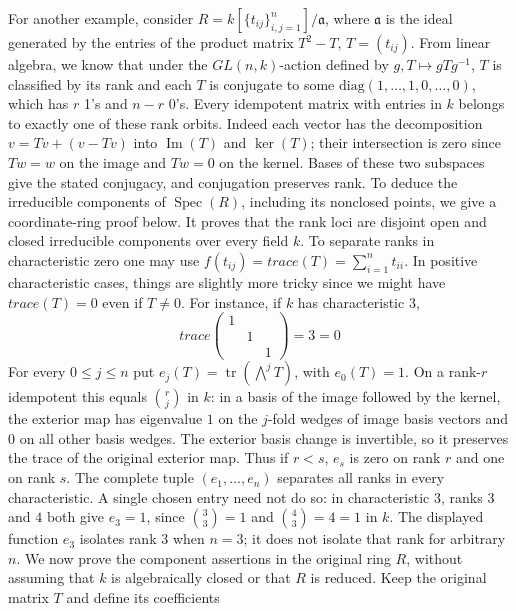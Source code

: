 \begin{example}
\label{editorial-source-example-idempotent-matrices}
For another example, consider
$R = k[\{t_{ij}\}_{i, j = 1}^{n}]/\mathfrak a$, where $\mathfrak a$ is
the ideal generated by the entries of the product matrix $T^2-T$,
$T = (t_{ij})$. From linear algebra, we know that under the
$GL(n, k)$-action defined by $g, T \mapsto gTg^{-1}$, $T$ is
classified by its rank and each $T$ is conjugate to some
$\text{diag}(1, \ldots, 1, 0, \ldots, 0)$, which has $r$ 1's and $n-r$ 0's.
Every idempotent matrix with entries in $k$ belongs to exactly one
of these rank orbits. Indeed each vector has the decomposition
$v=Tv+(v-Tv)$ into $\operatorname{Im}(T)$ and $\ker(T)$;
their intersection is zero since $Tw=w$ on the image and $Tw=0$
on the kernel. Bases of these two subspaces give the stated
conjugacy, and conjugation preserves rank. To deduce the irreducible
components of $\operatorname{Spec}(R)$, including its nonclosed
points, we give a coordinate-ring proof below. It proves that the
rank loci are disjoint open and closed irreducible components over
every field $k$. To separate ranks in characteristic zero one may use
$f(t_{ij}) = trace(T) = \sum_{i = 1}^nt_{ii}$. In positive
characteristic cases, things are slightly more tricky since we
might have $trace(T) = 0$ even if $T \neq 0$. For instance, if $k$ has characteristic $3$,
$$
trace\left(
\begin{matrix}
1 & & \\
& 1 & \\
& & 1
\end{matrix}
\right) = 3 = 0
$$
For every $0\leq j\leq n$ put
$e_j(T)=\operatorname{tr}(\bigwedge^jT)$, with $e_0(T)=1$.
On a rank-$r$ idempotent this equals $\binom rj$ in $k$:
in a basis of the image followed by the kernel, the exterior map
has eigenvalue $1$ on the $j$-fold wedges of image basis vectors
and $0$ on all other basis wedges. The exterior basis change is
invertible, so it preserves the trace of the original exterior map.
Thus if $r<s$, $e_s$ is zero on rank $r$ and one on rank $s$.
The complete tuple $(e_1,\ldots,e_n)$ separates all ranks in every
characteristic. A single chosen entry need not do so: in
characteristic $3$, ranks $3$ and $4$ both give $e_3=1$, since
$\binom33=1$ and $\binom43=4=1$ in $k$.
The displayed function $e_3$ isolates rank $3$ when $n=3$;
it does not isolate that rank for arbitrary $n$.
\medskip\noindent
We now prove the component assertions in the original ring $R$,
without assuming that $k$ is algebraically closed or that $R$ is
reduced. Keep the original matrix $T$ and define its coefficients

\end{example}
